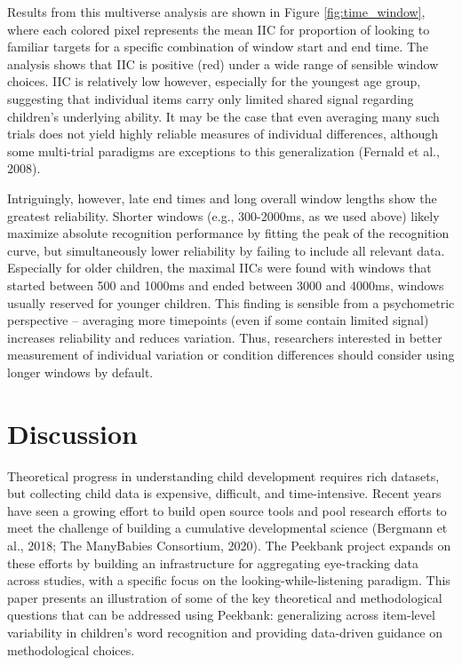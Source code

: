 \documentclass[10pt, letterpaper]{article}
\begin{document}
Results from this multiverse analysis are shown in Figure
\ref{fig:time_window}, where each colored pixel represents the mean IIC
for proportion of looking to familiar targets for a specific combination
of window start and end time. The analysis shows that IIC is positive
(red) under a wide range of sensible window choices. IIC is relatively
low however, especially for the youngest age group, suggesting that
individual items carry only limited shared signal regarding children's
underlying ability. It may be the case that even averaging many such
trials does not yield highly reliable measures of individual
differences, although some multi-trial paradigms are exceptions to this
generalization (Fernald et al., 2008).

Intriguingly, however, late end times and long overall window lengths
show the greatest reliability. Shorter windows (e.g., 300-2000ms, as we
used above) likely maximize absolute recognition performance by fitting
the peak of the recognition curve, but simultaneously lower reliability
by failing to include all relevant data. Especially for older children,
the maximal IICs were found with windows that started between 500 and
1000ms and ended between 3000 and 4000ms, windows usually reserved for
younger children. This finding is sensible from a psychometric
perspective -- averaging more timepoints (even if some contain limited
signal) increases reliability and reduces variation. Thus, researchers
interested in better measurement of individual variation or condition
differences should consider using longer windows by default.

\hypertarget{discussion}{%
\section{Discussion}\label{discussion}}

Theoretical progress in understanding child development requires rich
datasets, but collecting child data is expensive, difficult, and
time-intensive. Recent years have seen a growing effort to build open
source tools and pool research efforts to meet the challenge of building
a cumulative developmental science (Bergmann et al., 2018; The
ManyBabies Consortium, 2020). The Peekbank project expands on these
efforts by building an infrastructure for aggregating eye-tracking data
across studies, with a specific focus on the looking-while-listening
paradigm. This paper presents an illustration of some of the key
theoretical and methodological questions that can be addressed using
Peekbank: generalizing across item-level variability in children's word
recognition and providing data-driven guidance on methodological
choices.
\end{document}
